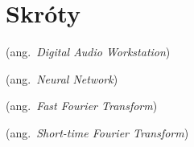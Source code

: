 % 
\chapter*{Skróty}
\label{sec:skroty}
\noindent\vspace{-\topsep-\partopsep-\parsep} %
\begin{description}[labelwidth=*]
  \item [DAW] (ang.\ \emph{Digital Audio Workstation}) %
  \item [NN] (ang.\ \emph{Neural Network}) %
  \item [FFT] (ang.\ \emph{Fast Fourier Transform}) %
  \item [STFT] (ang.\ \emph{Short-time Fourier Transform}) %
\end{description}
